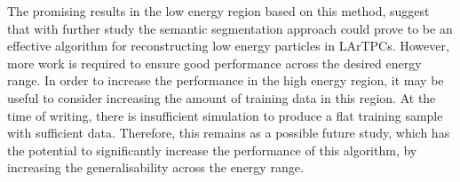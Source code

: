 The promising results in the low energy region based on this method, suggest
that with further study the semantic segmentation approach could prove to be an
effective algorithm for reconstructing low energy particles in LArTPCs. However,
more work is required to ensure good performance across the desired energy
range. In order to increase the performance in the high energy region, it may be
useful to consider increasing the amount of training data in this region. At the
time of writing, there is insufficient \protodune{} simulation to produce a 
flat training sample with sufficient data. Therefore, this remains as a 
possible future study, which has the potential to significantly increase the 
performance of this algorithm, by increasing the generalisability across the 
energy range.

